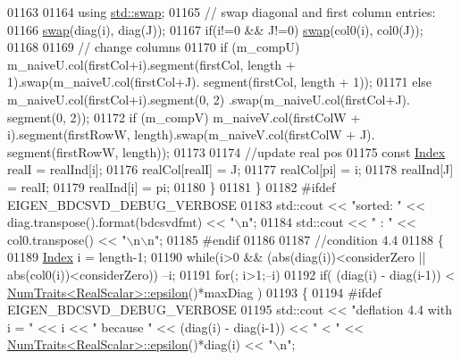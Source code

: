\begin{DoxyCode}
01163       
01164       \textcolor{keyword}{using} \hyperlink{endian_8c_a3ca5ecd34b04d6a243c054ac3a57f68d}{std::swap};
01165       \textcolor{comment}{// swap diagonal and first column entries:}
01166       \hyperlink{endian_8c_a3ca5ecd34b04d6a243c054ac3a57f68d}{swap}(diag(i), diag(J));
01167       \textcolor{keywordflow}{if}(i!=0 && J!=0) \hyperlink{endian_8c_a3ca5ecd34b04d6a243c054ac3a57f68d}{swap}(col0(i), col0(J));
01168 
01169       \textcolor{comment}{// change columns}
01170       \textcolor{keywordflow}{if} (m\_compU) m\_naiveU.col(firstCol+i).segment(firstCol, length + 1).swap(m\_naiveU.col(firstCol+J).
      segment(firstCol, length + 1));
01171       \textcolor{keywordflow}{else}         m\_naiveU.col(firstCol+i).segment(0, 2)                .swap(m\_naiveU.col(firstCol+J).
      segment(0, 2));
01172       \textcolor{keywordflow}{if} (m\_compV) m\_naiveV.col(firstColW + i).segment(firstRowW, length).swap(m\_naiveV.col(firstColW + J).
      segment(firstRowW, length));
01173 
01174       \textcolor{comment}{//update real pos}
01175       \textcolor{keyword}{const} \hyperlink{namespace_eigen_a62e77e0933482dafde8fe197d9a2cfde}{Index} realI = realInd[i];
01176       realCol[realI] = J;
01177       realCol[pi] = i;
01178       realInd[J] = realI;
01179       realInd[i] = pi;
01180     \}
01181   \}
01182 \textcolor{preprocessor}{#ifdef EIGEN\_BDCSVD\_DEBUG\_VERBOSE}
01183   std::cout << \textcolor{stringliteral}{"sorted: "} << diag.transpose().format(bdcsvdfmt) << \textcolor{stringliteral}{"\(\backslash\)n"};
01184   std::cout << \textcolor{stringliteral}{"      : "} << col0.transpose() << \textcolor{stringliteral}{"\(\backslash\)n\(\backslash\)n"};
01185 \textcolor{preprocessor}{#endif}
01186     
01187   \textcolor{comment}{//condition 4.4}
01188   \{
01189     \hyperlink{namespace_eigen_a62e77e0933482dafde8fe197d9a2cfde}{Index} i = length-1;
01190     \textcolor{keywordflow}{while}(i>0 && (abs(diag(i))<considerZero || abs(col0(i))<considerZero)) --i;
01191     \textcolor{keywordflow}{for}(; i>1;--i)
01192        \textcolor{keywordflow}{if}( (diag(i) - diag(i-1)) < \hyperlink{group___core___module_struct_eigen_1_1_num_traits}{NumTraits<RealScalar>::epsilon}()*maxDiag )
01193       \{
01194 \textcolor{preprocessor}{#ifdef EIGEN\_BDCSVD\_DEBUG\_VERBOSE}
01195         std::cout << \textcolor{stringliteral}{"deflation 4.4 with i = "} << i << \textcolor{stringliteral}{" because "} << (diag(i) - diag(i-1)) << \textcolor{stringliteral}{" < "} << 
      \hyperlink{group___core___module_struct_eigen_1_1_num_traits}{NumTraits<RealScalar>::epsilon}()*diag(i) << \textcolor{stringliteral}{"\(\backslash\)n"};

\end{DoxyCode}
